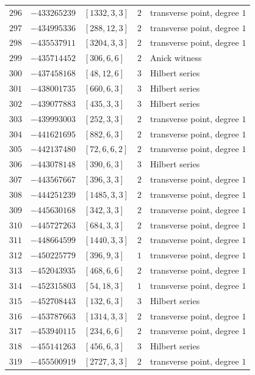 \documentclass[11pt]{article}
\begin{document}
\begin{center}
\begin{longtable}{r r l c l}
$296$ & $-433265239$ & $[1332,3,3]$ & $2$ & transverse point, degree $1$\\
$297$ & $-434995336$ & $[288,12,3]$ & $2$ & transverse point, degree $1$\\
$298$ & $-435537911$ & $[3204,3,3]$ & $2$ & transverse point, degree $1$\\
$299$ & $-435714452$ & $[306,6,6]$ & $2$ & Anick witness\\
$300$ & $-437458168$ & $[48,12,6]$ & $3$ & Hilbert series\\
$301$ & $-438001735$ & $[660,6,3]$ & $3$ & Hilbert series\\
$302$ & $-439077883$ & $[435,3,3]$ & $3$ & Hilbert series\\
$303$ & $-439993003$ & $[252,3,3]$ & $2$ & transverse point, degree $1$\\
$304$ & $-441621695$ & $[882,6,3]$ & $2$ & transverse point, degree $1$\\
$305$ & $-442137480$ & $[72,6,6,2]$ & $2$ & transverse point, degree $1$\\
$306$ & $-443078148$ & $[390,6,3]$ & $3$ & Hilbert series\\
$307$ & $-443567667$ & $[396,3,3]$ & $2$ & transverse point, degree $1$\\
$308$ & $-444251239$ & $[1485,3,3]$ & $2$ & transverse point, degree $1$\\
$309$ & $-445630168$ & $[342,3,3]$ & $2$ & transverse point, degree $1$\\
$310$ & $-445727263$ & $[684,3,3]$ & $2$ & transverse point, degree $1$\\
$311$ & $-448664599$ & $[1440,3,3]$ & $2$ & transverse point, degree $1$\\
$312$ & $-450225779$ & $[396,9,3]$ & $1$ & transverse point, degree $1$\\
$313$ & $-452043935$ & $[468,6,6]$ & $2$ & transverse point, degree $1$\\
$314$ & $-452315803$ & $[54,18,3]$ & $1$ & transverse point, degree $1$\\
$315$ & $-452708443$ & $[132,6,3]$ & $3$ & Hilbert series\\
$316$ & $-453787663$ & $[1314,3,3]$ & $2$ & transverse point, degree $1$\\
$317$ & $-453940115$ & $[234,6,6]$ & $2$ & transverse point, degree $1$\\
$318$ & $-455141263$ & $[456,6,3]$ & $3$ & Hilbert series\\
$319$ & $-455500919$ & $[2727,3,3]$ & $2$ & transverse point, degree $1$\\

\end{longtable}
\end{center}
\end{document}
